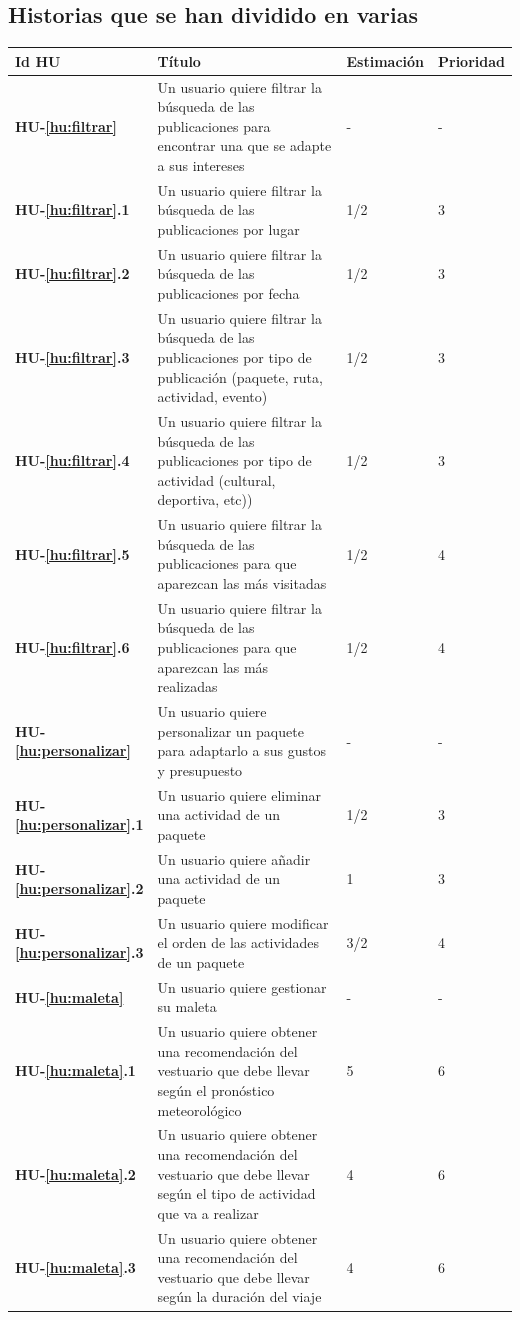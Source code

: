 \documentclass[11pt]{article}
\begin{document}
\subsection{Historias que se han dividido en varias}

  \begin{longtable}{p{0.13\linewidth}p{0.67\linewidth}p{0.15\linewidth}p{0.15\linewidth}}
    \toprule
    \textbf{Id HU} & \textbf{Título} & \textbf{Estimación} & \textbf{Prioridad}\\
    \midrule
    
    \textbf{HU-\ref{hu:filtrar}} & Un usuario quiere filtrar la búsqueda de las publicaciones para encontrar una que se adapte a sus intereses & - & -\\ 
	\textbf{HU-\ref{hu:filtrar}.1} & Un usuario quiere filtrar la búsqueda de las publicaciones por lugar & 1/2 & 3\\ 
	\textbf{HU-\ref{hu:filtrar}.2} & Un usuario quiere filtrar la búsqueda de las publicaciones por fecha & 1/2 & 3\\ 
	\textbf{HU-\ref{hu:filtrar}.3} & Un usuario quiere filtrar la búsqueda de las publicaciones por tipo de publicación (paquete, ruta, actividad, evento) & 1/2 & 3\\ 
	\textbf{HU-\ref{hu:filtrar}.4} & Un usuario quiere filtrar la búsqueda de las publicaciones por tipo de actividad (cultural, deportiva, etc)) & 1/2 & 3\\ 
	\textbf{HU-\ref{hu:filtrar}.5} & Un usuario quiere filtrar la búsqueda de las publicaciones para que aparezcan las más visitadas & 1/2 & 4\\ 
	\textbf{HU-\ref{hu:filtrar}.6} & Un usuario quiere filtrar la búsqueda de las publicaciones para que aparezcan las más realizadas & 1/2 & 4\\ 
	\midrule
	\textbf{HU-\ref{hu:personalizar}} & Un usuario quiere personalizar un paquete para adaptarlo a sus gustos y presupuesto & - & - \\
	\textbf{HU-\ref{hu:personalizar}.1} & Un usuario quiere eliminar una actividad de un paquete & 1/2 & 3 \\ 
	\textbf{HU-\ref{hu:personalizar}.2} & Un usuario quiere añadir una actividad de un paquete & 1 & 3 \\ 
	\textbf{HU-\ref{hu:personalizar}.3} & Un usuario quiere modificar el orden de las actividades de un paquete & 3/2 & 4 \\
	\midrule 
	\textbf{HU-\ref{hu:maleta}} & Un usuario quiere gestionar su maleta & - & -\\
	\textbf{HU-\ref{hu:maleta}.1} & Un usuario quiere obtener una recomendación del vestuario que debe llevar según el pronóstico meteorológico & 5 & 6\\
	\textbf{HU-\ref{hu:maleta}.2} & Un usuario quiere obtener una recomendación del vestuario que debe llevar según el tipo de actividad que va a realizar & 4 & 6\\
	\textbf{HU-\ref{hu:maleta}.3} & Un usuario quiere obtener una recomendación del vestuario que debe llevar según la duración del viaje & 4 & 6\\
    \bottomrule
  \end{longtable}
\end{document}

